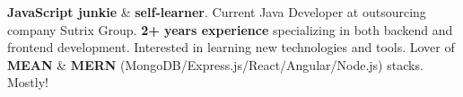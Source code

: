

\begin{cvparagraph}

\textbf{JavaScript junkie} \& \textbf{self-learner}. Current Java Developer at outsourcing company Sutrix Group. \textbf{2+ years experience} specializing in both backend and frontend development. Interested in learning new technologies and tools. Lover of \textbf{MEAN} \& \textbf{MERN} (MongoDB/Express.js/React/Angular/Node.js) stacks. Mostly!
\end{cvparagraph}
